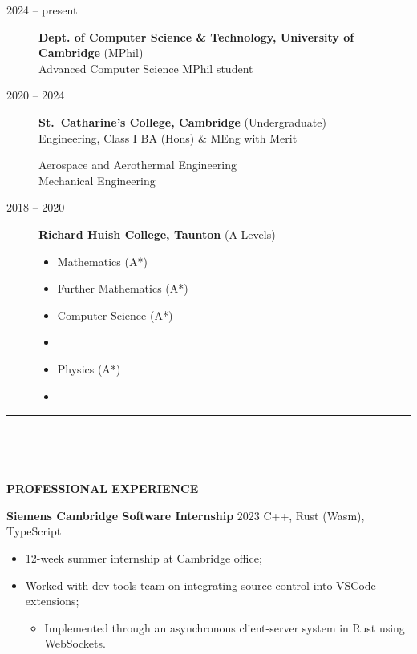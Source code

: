 \documentclass[
  11pt,
  a4paper,
]{article}
\providecommand{\tightlist}{%
  \setlength{\itemsep}{0pt}\setlength{\parskip}{0pt}}
\newcommand{\itemspace}{0.8ex}
\newcommand{\ruledheader}[2]{%
\begingroup
\setlength{\fboxsep}{0pt}%
\colorbox{#1}{%
\parbox[b][1.2ex][t]{35mm}{\begin{tiny}\ \end{tiny}}}%
\parbox[b][1.2ex][t]{5mm}{\begin{tiny}\ \end{tiny}}%
\uppercase{\textbf{#2}}
\endgroup}
\begin{document}
\begin{description}
\item[2024 – present]
\textbf{Dept. of Computer Science \& Technology, University of
Cambridge} (MPhil)\\
Advanced Computer Science MPhil student
\item[2020 – 2024]
\textbf{St.~Catharine’s College, Cambridge} (Undergraduate)\\
Engineering, Class I BA (Hons) \& MEng with Merit

Aerospace and Aerothermal Engineering\\
Mechanical Engineering
\item[2018 – 2020]
\textbf{Richard Huish College, Taunton} (A-Levels)

\begingroup
\begin{multicols}{3}

\begin{itemize}
\tightlist
\item
  Mathematics (A*)
\item
  Further Mathematics (A*)
\item
  Computer Science (A*)
\item
\item
  Physics (A*)
\item
\end{itemize}

\end{multicols}
\vspace{-\parskip}\endgroup
\end{description}

\begin{Large}

\vspace{-1.5ex}\rule{\textwidth}{0.8pt}\vspace{2ex}

\ruledheader{cyan!50!teal}{Professional experience}\end{Large}

\vspace{\itemspace}

\textbf{Siemens Cambridge Software Internship} \textbar{} 2023
\textbar{} C++, Rust (Wasm), TypeScript

\begin{itemize}
\tightlist
\item
  12-week summer internship at Cambridge office;
\item
  Worked with dev tools team on integrating source control into VSCode
  extensions;

  \begin{itemize}
  \tightlist
  \item
    Implemented through an asynchronous client-server system in Rust
    using WebSockets.
  \end{itemize}
\end{itemize}
\end{document}
